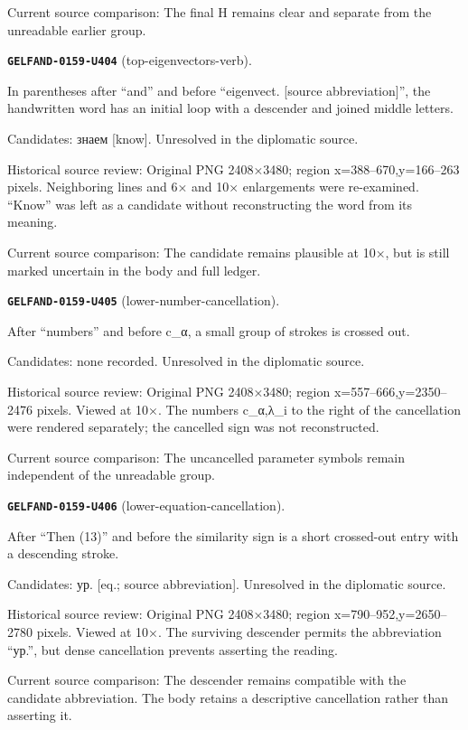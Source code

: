 Current source comparison: The final H remains clear and separate from the unreadable earlier group.\par\medskip
\par\noindent\leavevmode{}\label{GELFAND-0159-U404}\label{GELFAND-P001470:top-eigenvectors-verb}\textbf{\texttt{GELFAND-0159-U404}} (top-eigenvectors-verb).\nopagebreak[4]\par
In parentheses after “and” and before “eigenvect. [source abbreviation]”, the handwritten word has an initial loop with a descender and joined middle letters.\par
Candidates: знаем [know]. Unresolved in the diplomatic source.\par
Historical source review: Original PNG 2408×3480; region x=388–670,y=166–263 pixels. Neighboring lines and 6× and 10× enlargements were re-examined. “Know” was left as a candidate without reconstructing the word from its meaning.\par
Current source comparison: The candidate remains plausible at 10×, but is still marked uncertain in the body and full ledger.\par\medskip
\par\noindent\leavevmode{}\label{GELFAND-0159-U405}\label{GELFAND-P001470:lower-number-cancellation}\textbf{\texttt{GELFAND-0159-U405}} (lower-number-cancellation).\nopagebreak[4]\par
After “numbers” and before c\_α, a small group of strokes is crossed out.\par
Candidates: none recorded. Unresolved in the diplomatic source.\par
Historical source review: Original PNG 2408×3480; region x=557–666,y=2350–2476 pixels. Viewed at 10×. The numbers c\_α,λ\_i to the right of the cancellation were rendered separately; the cancelled sign was not reconstructed.\par
Current source comparison: The uncancelled parameter symbols remain independent of the unreadable group.\par\medskip
\par\noindent\leavevmode{}\label{GELFAND-0159-U406}\label{GELFAND-P001470:lower-equation-cancellation}\textbf{\texttt{GELFAND-0159-U406}} (lower-equation-cancellation).\nopagebreak[4]\par
After “Then (13)” and before the similarity sign is a short crossed-out entry with a descending stroke.\par
Candidates: ур. [eq.; source abbreviation]. Unresolved in the diplomatic source.\par
Historical source review: Original PNG 2408×3480; region x=790–952,y=2650–2780 pixels. Viewed at 10×. The surviving descender permits the abbreviation “ур.”, but dense cancellation prevents asserting the reading.\par
Current source comparison: The descender remains compatible with the candidate abbreviation. The body retains a descriptive cancellation rather than asserting it.\par\medskip
